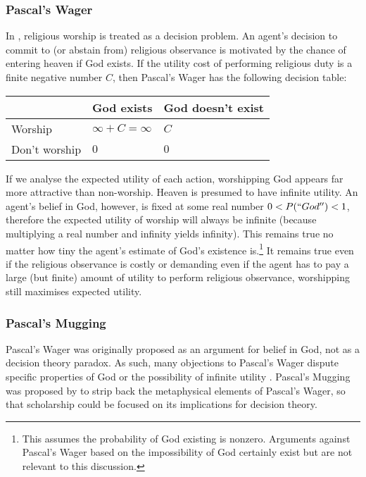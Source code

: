 \documentclass{article}
\begin{document}
\subsubsection {Pascal's Wager}

In \citet{pascal1852pensees}, religious worship is treated as a decision problem. An agent's decision to commit to (or abstain from) religious observance is motivated by the chance of entering heaven if God exists. If the utility cost of performing religious duty is a finite negative number \(C\), then Pascal's Wager has the following decision table:

\begin{center}
\begin{tabular}{ | l | l | l |}
  \hline
    & God exists & God doesn't exist \\ \hline
  Worship & \(\infty+C=\infty\) & \(C\) \\ \hline
  Don't worship & \(0\)  & \(0\) \\
  \hline
\end{tabular}
\end{center}

If we analyse the expected utility of each action, worshipping God appears far more attractive than non-worship. Heaven is presumed to have infinite utility. An agent's belief in God, however, is fixed at some real number \(0<P(``God'')<1\), therefore the expected utility of worship will always be infinite (because multiplying a real number and infinity yields infinity). This remains true no matter how tiny the agent's estimate of God's existence is.\footnote{This assumes the probability of God existing is nonzero. Arguments against Pascal's Wager based on the impossibility of God certainly exist \citep{oppy1991rescher} but are not relevant to this discussion.} It remains true even if the religious observance is costly or demanding \textemdash{} even if the agent has to pay a large (but finite) amount of utility to perform religious observance, worshipping still maximises expected utility.

\subsubsection {Pascal's Mugging}
Pascal's Wager was originally proposed as an argument for belief in God, not as a decision theory paradox. As such, many objections to Pascal's Wager dispute specific properties of God \citep{mackie1990miracle} or the possibility of infinite utility \citep{mcclennen1994pascal}. Pascal's Mugging was proposed by \citet{bostrom2009pascal} to strip back the metaphysical elements of Pascal's Wager, so that scholarship could be focused on its implications for decision theory.
\end{document}
